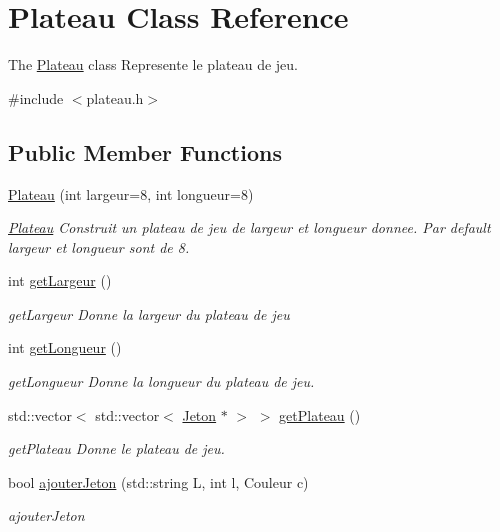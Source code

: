 \hypertarget{class_plateau}{}\section{Plateau Class Reference}
\label{class_plateau}


The \hyperlink{class_plateau}{Plateau} class Represente le plateau de jeu.  




{\ttfamily \#include $<$plateau.\+h$>$}

\subsection*{Public Member Functions}
\begin{DoxyCompactItemize}
\item 
\hyperlink{class_plateau_a300fd6b9d8e3bc9856b0b2984ba2270a}{Plateau} (int largeur=8, int longueur=8)
\begin{DoxyCompactList}\small\item\em \hyperlink{class_plateau}{Plateau} Construit un plateau de jeu de largeur et longueur donnee. Par default largeur et longueur sont de 8. \end{DoxyCompactList}\item 
int \hyperlink{class_plateau_a6b595fd1ae0f623aed1e82daaaa43915}{get\+Largeur} ()
\begin{DoxyCompactList}\small\item\em get\+Largeur Donne la largeur du plateau de jeu \end{DoxyCompactList}\item 
int \hyperlink{class_plateau_a5bb31cf61b30029ee4529371bcd9c88d}{get\+Longueur} ()
\begin{DoxyCompactList}\small\item\em get\+Longueur Donne la longueur du plateau de jeu. \end{DoxyCompactList}\item 
std\+::vector$<$ std\+::vector$<$ \hyperlink{class_jeton}{Jeton} $\ast$ $>$ $>$ \hyperlink{class_plateau_a06d81d6952b68c4c23e22c82b43fd509}{get\+Plateau} ()
\begin{DoxyCompactList}\small\item\em get\+Plateau Donne le plateau de jeu. \end{DoxyCompactList}\item 
bool \hyperlink{class_plateau_ac16100f204ae060224ddfed4213918b4}{ajouter\+Jeton} (std\+::string L, int l, Couleur c)
\begin{DoxyCompactList}\small\item\em ajouter\+Jeton \end{DoxyCompactList}\item 

\end{DoxyCompactItemize}
